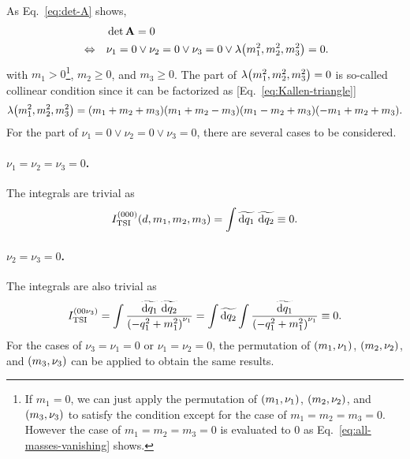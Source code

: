 \documentclass{article}
\begin{document}
            As Eq.~\eqref{eq:det-A} shows,
            \begin{equation}
                \begin{aligned}
                    & & & \det \vb{A} = 0 \\
                    & \Leftrightarrow & & \nu_1 = 0 \lor \nu_2 = 0 \lor \nu_3 = 0 \lor \lambdaFun{m_1^2, m_2^2, m_3^2} = 0.
                \end{aligned}
            \end{equation}
            with $m_1 > 0$\footnote{
                If $m_1 = 0$, we can just apply the permutation of $\qty(m_1, \nu_1)$, $\qty(m_2, \nu_2)$, and $\qty(m_3, \nu_3)$ to satisfy the condition except for the case of $m_1 = m_2 = m_3 = 0$.
                However the case of $m_1 = m_2 = m_3 = 0$ is evaluated to $0$ as Eq.~\eqref{eq:all-masses-vanishing} shows.
            }, $m_2 \ge 0$, and $m_3 \ge 0$.
            The part of $\lambdaFun{m_1^2, m_2^2, m_3^2} = 0$ is so-called collinear condition since it can be factorized as [Eq.~\eqref{eq:Kallen-triangle}]
            \begin{equation}
                \lambdaFun{m_1^2, m_2^2, m_3^2} = \qty(m_1 + m_2 + m_3) \qty(m_1 + m_2 - m_3) \qty(m_1 - m_2 + m_3) \qty(-m_1 + m_2 + m_3).
            \end{equation}
            For the part of $\nu_1 = 0 \lor \nu_2 = 0 \lor \nu_3 = 0$, there are several cases to be considered.
            
            \paragraph{\boldmath $\nu_1 = \nu_2 = \nu_3 = 0$.}
            The integrals are trivial as
            \begin{equation}
                \TSI{0 0 0}[d, m_1, m_2, m_3] = \int \tildedp{q_1} ~ \tildedp{q_2} \equiv 0.
                \label{eq:TSI-000}
            \end{equation}

            \paragraph{\boldmath $\nu_2 = \nu_3 = 0$.}
            The integrals are also trivial as
            \begin{equation}
                \TSI{0 0 \nu_3} = \int \frac{\tildedp{q_1} ~ \tildedp{q_2}}{\qmOne*} = \int \tildedp{q_2} \int \frac{\tildedp{q_1}}{\qmOne*} \equiv 0.
                \label{eq:TSI-00n}
            \end{equation}
            For the cases of $\nu_3 = \nu_1 = 0$ or $\nu_1 = \nu_2 = 0$, the permutation of $\qty(m_1, \nu_1)$, $\qty(m_2, \nu_2)$, and $\qty(m_3, \nu_3)$ can be applied to obtain the same results.
\end{document}
